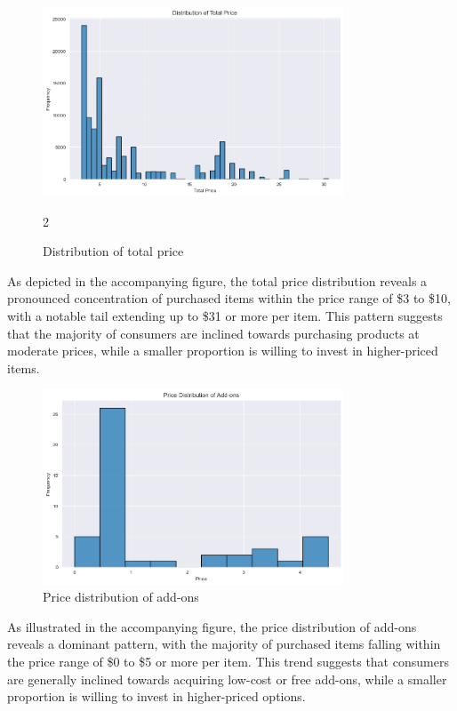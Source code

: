 \begin{figure}[H]
	\centering
	\includegraphics[width=0.8\textwidth]{assets/basic/distribution of total price.png}
	\caption{Distribution of total price}2
	\label{fig:distribution_of_total_price}
\end{figure}

As depicted in the accompanying figure, the total price distribution reveals a pronounced concentration of purchased items within the price range of \$3 to \$10, with a notable tail extending up to \$31 or more per item. This pattern suggests that the majority of consumers are inclined towards purchasing products at moderate prices, while a smaller proportion is willing to invest in higher-priced items.

\begin{figure}[H]
	\centering
	\includegraphics[width=0.8\textwidth]{assets/basic/price distribution of add ons.png}
	\caption{Price distribution of add-ons}
	\label{fig:price_distribution_of_addons}
\end{figure}

As illustrated in the accompanying figure, the price distribution of add-ons reveals a dominant pattern, with the majority of purchased items falling within the price range of \$0 to \$5 or more per item. This trend suggests that consumers are generally inclined towards acquiring low-cost or free add-ons, while a smaller proportion is willing to invest in higher-priced options.














